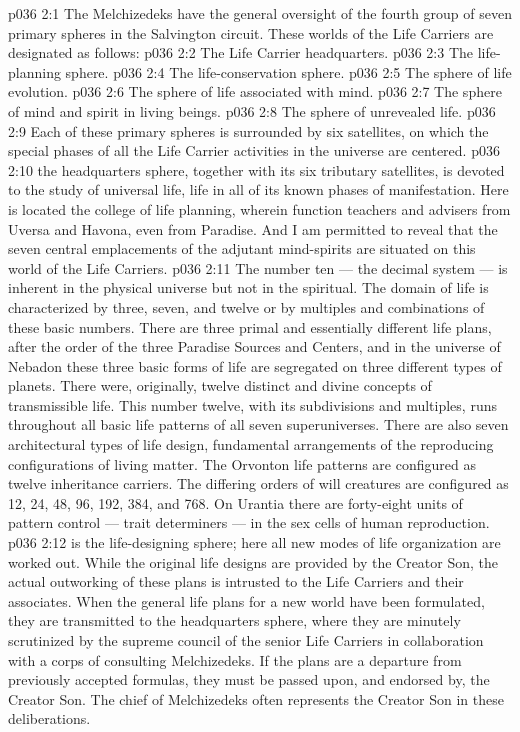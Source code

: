 \vs p036 2:1 The Melchizedeks have the general oversight of the fourth group of seven primary spheres in the Salvington circuit. These worlds of the Life Carriers are designated as follows:
\vs p036 2:2 \bibnobreakspace The Life Carrier headquarters.
\vs p036 2:3 \bibnobreakspace The life\hyp{}planning sphere.
\vs p036 2:4 \bibnobreakspace The life\hyp{}conservation sphere.
\vs p036 2:5 \bibnobreakspace The sphere of life evolution.
\vs p036 2:6 \bibnobreakspace The sphere of life associated with mind.
\vs p036 2:7 \bibnobreakspace The sphere of mind and spirit in living beings.
\vs p036 2:8 \bibnobreakspace The sphere of unrevealed life.
\vs p036 2:9 \pc Each of these primary spheres is surrounded by six satellites, on which the special phases of all the Life Carrier activities in the universe are centered.
\vs p036 2:10 \pc {} the headquarters sphere, together with its six tributary satellites, is devoted to the study of universal life, life in all of its known phases of manifestation. Here is located the college of life planning, wherein function teachers and advisers from Uversa and Havona, even from Paradise. And I am permitted to reveal that the seven central emplacements of the adjutant mind\hyp{}spirits are situated on this world of the Life Carriers.
\vs p036 2:11 The number ten --- the decimal system --- is inherent in the physical universe but not in the spiritual. The domain of life is characterized by three, seven, and twelve or by multiples and combinations of these basic numbers. There are three primal and essentially different life plans, after the order of the three Paradise Sources and Centers, and in the universe of Nebadon these three basic forms of life are segregated on three different types of planets. There were, originally, twelve distinct and divine concepts of transmissible life. This number twelve, with its subdivisions and multiples, runs throughout all basic life patterns of all seven superuniverses. There are also seven architectural types of life design, fundamental arrangements of the reproducing configurations of living matter. The Orvonton life patterns are configured as twelve inheritance carriers. The differing orders of will creatures are configured as 12, 24, 48, 96, 192, 384, and 768. On Urantia there are forty\hyp{}eight units of pattern control --- trait determiners --- in the sex cells of human reproduction.
\vs p036 2:12 \pc {} is the life\hyp{}designing sphere; here all new modes of life organization are worked out. While the original life designs are provided by the Creator Son, the actual outworking of these plans is intrusted to the Life Carriers and their associates. When the general life plans for a new world have been formulated, they are transmitted to the headquarters sphere, where they are minutely scrutinized by the supreme council of the senior Life Carriers in collaboration with a corps of consulting Melchizedeks. If the plans are a departure from previously accepted formulas, they must be passed upon, and endorsed by, the Creator Son. The chief of Melchizedeks often represents the Creator Son in these deliberations.
